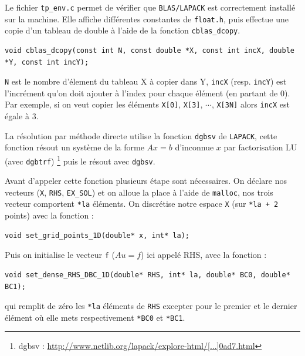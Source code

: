\documentclass{article}
\begin{document}
Le fichier \texttt{tp\_env.c} permet de vérifier que \texttt{BLAS/LAPACK} est correctement installé sur la machine. Elle affiche différentes constantes de \texttt{float.h}, puis effectue une copie d'un tableau de double à l'aide de la fonction \texttt{cblas\_dcopy}.

\begin{scriptsize}
\begin{verbatim}
void cblas_dcopy(const int N, const double *X, const int incX, double *Y, const int incY);
\end{verbatim}
\end{scriptsize}
\texttt{N} est le nombre d'élement du tableau X à copier dans Y, \texttt{incX} (resp. \texttt{incY}) est l'incrément qu'on doit ajouter à l'index pour chaque élément (en partant de 0). Par exemple, si on veut copier les éléments \texttt{X[0]}, \texttt{X[3]}, $\cdots$, \texttt{X[3N]} alors \texttt{incX} est égale à $3$.

La résolution par méthode directe utilise la fonction \texttt{dgbsv} de \texttt{LAPACK}, cette fonction résout un système de la forme $Ax = b$ d'inconnue $x$ par factorisation LU (avec \texttt{dgbtrf}) \footnote{dgbsv : \href{http://www.netlib.org/lapack/explore-html/d3/d49/group__double_g_bsolve_gafa35ce1d7865b80563bbed6317050ad7.html}{http://www.netlib.org/lapack/explore-html/[...]0ad7.html}} puis le résout avec \texttt{dgbsv}.

Avant d'appeler cette fonction plusieurs étape sont nécessaires. On déclare nos vecteurs (\texttt{X}, \texttt{RHS}, \texttt{EX\_SOL}) et on alloue la place à l'aide de \texttt{malloc}, nos trois vecteur comportent \texttt{*la} éléments. On discrétise notre espace \texttt{X} (sur \texttt{*la + 2} points) avec la fonction :
\begin{scriptsize}
\begin{verbatim}
void set_grid_points_1D(double* x, int* la);
\end{verbatim}
\end{scriptsize}
Puis on initialise le vecteur \texttt{f} ($Au = f$) ici appelé RHS, avec la fonction : \begin{scriptsize}
\begin{verbatim}
void set_dense_RHS_DBC_1D(double* RHS, int* la, double* BC0, double* BC1);
\end{verbatim}
\end{scriptsize}
qui remplit de zéro les \texttt{*la} éléments de \texttt{RHS} excepter pour le premier et le dernier élément où elle mets respectivement \texttt{*BC0} et \texttt{*BC1}.
\end{document}

